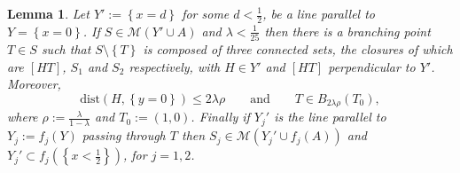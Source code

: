 \documentclass{amsart}
\newcommand{\ENCLOSE}[1]{\left\{#1\right\}}
\newcommand{\M}{\mathcal{M}}
\newcommand{\dist}{\mathrm{dist}}
\newtheorem{lemma}[theorem]{Lemma}
\theoremstyle{definition}
\theoremstyle{remark}
\begin{document}
\begin{lemma}\label{lm:branching}
  Let $Y':=\ENCLOSE{x=d}$ for some $d<\frac 1 2$,
  be a line parallel to $Y=\ENCLOSE{x=0}$.
  If $S\in \M(Y'\cup A)$
  and $\lambda < \frac 1 {25}$ then
  there is a branching point $T\in S$ 
  such that $S\setminus \ENCLOSE{T}$ is composed of 
  three connected sets, the closures of which are
   $[HT]$, $S_1$ and $S_2$ respectively,
  with $H\in Y'$ and $[HT]$ perpendicular to $Y'$.  
  Moreover, 
  \begin{equation}\label{eq:474947}
    \dist(H,\ENCLOSE{y=0})\le 2\lambda\rho
    \qquad\text{and}\qquad 
    T\in B_{2\lambda\rho}(T_0), 
  \end{equation}
  where $\rho:=\frac{\lambda}{1-\lambda}$ and $T_0:=(1,0)$.
  Finally if $Y_j'$ is the line parallel to $Y_j:=f_j(Y)$ 
  passing through $T$ 
  then $S_j \in \M(Y_j'\cup f_j(A))$ 
  and $Y_j'\subset f_j(\ENCLOSE{x<\frac 1 2})$,
  for $j=1,2$.
\end{lemma}
\end{document}
